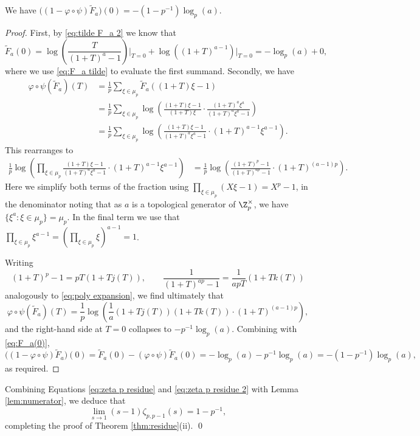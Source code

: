 \documentclass[a4paper,10pt, english, reqno]{smfart}
\numberwithin{equation}{section}
\begin{document}
\begin{lemma}\label{lem:numerator}
We have $\big((1-\varphi\circ\psi)\widetilde{F}_{a}\big)(0) = -(1-p^{-1})\log_p(a)$.
\end{lemma}
\begin{proof}
First, by \eqref{eq:tilde F_a 2} we know that
\begin{equation}\label{eq:F_a(0)}
    \widetilde{F}_a(0) = \log\left(\frac{T}{(1+T)^a-1}\right)\Big|_{T=0}  + \log\left( (1+T)^{a-1}\right)|_{T=0} = -\log_p(a) + 0,
\end{equation}
where we use \eqref{eq:F_a tilde} to evaluate the first summand. Secondly,  we have
\begin{align*}
\varphi\circ\psi(\widetilde{F}_a)(T) &= \frac{1}{p}\sum_{\xi \in \mu_p}\widetilde{F}_a((1+T)\xi -1)\\
&= \frac{1}{p}\sum_{\xi \in \mu_p}\log\left(\frac{(1+T)\xi -1}{(1+T)\xi} \cdot \frac{(1+T)^a\xi^a}{(1+T)^a\xi^a-1}\right)\\
&= \frac{1}{p}\sum_{\xi \in \mu_p}\log\left(\frac{(1+T)\xi -1}{(1+T)^a\xi^a-1} \cdot (1+T)^{a-1}\xi^{a-1}\right).
\end{align*}
This rearranges to
\begin{align*}
\frac{1}{p}\log\left(\prod_{\xi \in \mu_p}\frac{(1+T)\xi -1}{(1+T)^a\xi^a-1} \cdot (1+T)^{a-1}\xi^{a-1}\right) &= \frac{1}{p}\log\left(\frac{(1+T)^p -1}{(1+T)^{ap}-1} \cdot (1+T)^{(a-1)p}\right).
\end{align*}
Here we simplify both terms of the fraction using $\prod_{\xi\in\mu_p}(X\xi - 1) = X^p - 1$, in the denominator noting that as $a$ is a topological generator of $\Z_p^\times$, we have $\{\xi^a : \xi \in \mu_p\} = \mu_p$. In the final term we use that $\prod_{\xi\in\mu_p}\xi^{a-1} = (\prod_{\xi \in \mu_p}\xi)^{a-1} = 1$.


Writing 
\[
    (1+T)^p-1 = pT(1+Tj(T)), \qquad \frac{1}{(1+T)^{ap}-1} = \frac{1}{apT}(1+Tk(T))
\]
analogously to \eqref{eq:poly expansion}, we find ultimately that
\[
\varphi\circ\psi(\widetilde{F}_a)(T) = \frac{1}{p}\log\left(\frac{1}{a} (1+Tj(T))(1+Tk(T)) \cdot (1+T)^{(a-1)p}\right),
\]
and the right-hand side at $T=0$ collapses to $-p^{-1}\log_p(a)$. Combining with \eqref{eq:F_a(0)},
\[
    \Big((1-\varphi\circ\psi)\widetilde{F}_a\Big)(0) = \widetilde{F}_a(0) - (\varphi\circ\psi)\widetilde{F}_a(0) = -\log_p(a) -p^{-1}\log_p(a) = -(1-p^{-1})\log_p(a),
\]
as required.
\end{proof}

Combining Equations \eqref{eq:zeta p residue} and \eqref{eq:zeta p residue 2} with Lemma \ref{lem:numerator}, we deduce that
\[ \lim_{s \to 1} (s - 1) \zeta_{p, p-1}(s) = 1 - p^{-1}, \]
completing the proof of Theorem \ref{thm:residue}(ii). \qed
\end{document}

